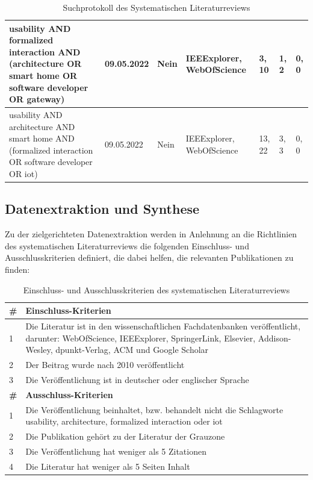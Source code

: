 \begin{table}[hbt!]
\begin{center}
\begin{tabular}{| p{2.9cm} | p{1.9cm} | p{1.6cm} | p{1.9cm} | p{1.9cm} | p{1.8cm} | p{1.8cm} | }
                    \hline
                        usability AND formalized interaction AND (architecture OR smart home OR software developer OR gateway) & 09.05.2022 & Nein & IEEExplorer, WebOfScience & 3, 10 & 1, 2 & 0, 0 \\
                    \hline
                        usability AND architecture AND smart home AND (formalized interaction OR software developer OR iot) & 09.05.2022 & Nein & IEEExplorer, WebOfScience & 13, 22 & 3, 3 & 0, 0 \\
                    \hline
                \end{tabular}
            \end{center}
            \caption{Suchprotokoll des Systematischen Literaturreviews}
            \label{tab:slr}
        \end{table}
    \subsection{Datenextraktion und Synthese}
        Zu der zielgerichteten Datenextraktion werden in Anlehnung an die Richtlinien des systematischen Literaturreviews die folgenden 
        Einschluss- und Ausschlusskriterien definiert, die dabei helfen, die relevanten Publikationen zu finden:
        \begin{table}[hbt!]
            \centering
            \begin{tabular}{p{0.125cm} p{15cm}}
                    \textbf{\#} & \textbf{Einschluss-Kriterien}\\ 
                \hline
                    1  & Die Literatur ist in den wissenschaftlichen Fachdatenbanken veröffentlicht, darunter: WebOfScience, IEEExplorer, SpringerLink, Elsevier, Addison-Wesley, dpunkt-Verlag, ACM und Google Scholar  \\ 
                \hline
                    2  & Der Beitrag wurde nach 2010 veröffentlicht \\ 
                \hline
                    3  & Die Veröffentlichung ist in deutscher oder englischer Sprache \\
                \hline
                    \textbf{\#} & \textbf{Ausschluss-Kriterien}\\ 
                \hline
                    1  & Die Veröffentlichung beinhaltet, bzw. behandelt nicht die Schlagworte usability, architecture, formalized interaction oder iot \\ 
                \hline
                    2  & Die Publikation gehört zu der Literatur der Grauzone \\ 
                \hline
                    3  & Die Veröffentlichung hat weniger als 5 Zitationen \\
                \hline
                    4  & Die Literatur hat weniger als 5 Seiten Inhalt \\
            \end{tabular}
            \caption{Einschluss- und Ausschlusskriterien des systematischen Literaturreviews}
            \label{tab:slr_criteria}
        \end{table}
